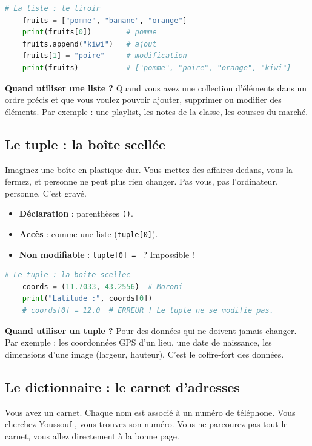 \documentclass[12pt,a4paper]{article}
\begin{document}
\begin{lstlisting}[language=Python]
	# La liste : le tiroir
	fruits = ["pomme", "banane", "orange"]
	print(fruits[0])        # pomme
	fruits.append("kiwi")   # ajout
	fruits[1] = "poire"     # modification
	print(fruits)           # ["pomme", "poire", "orange", "kiwi"]
\end{lstlisting}

\textbf{Quand utiliser une liste ?} Quand vous avez une collection d'éléments dans un ordre précis et que vous voulez pouvoir ajouter, supprimer ou modifier des éléments. Par exemple : une playlist, les notes de la classe, les courses du marché.

\subsection{Le tuple : la boîte scellée}

Imaginez une boîte en plastique dur. Vous mettez des affaires dedans, vous la fermez, et personne ne peut plus rien changer. Pas vous, pas l'ordinateur, personne. C'est gravé.

\begin{itemize}
	\item [\ding{182}] \textbf{Déclaration} : parenthèses \texttt{()}.
	\item [\ding{183}] \textbf{Accès} : comme une liste (\texttt{tuple[0]}).
	\item [\ding{184}] \textbf{Non modifiable} : \texttt{tuple[0] = } ? Impossible !
\end{itemize}

\begin{lstlisting}[language=Python]
	# Le tuple : la boite scellee
	coords = (11.7033, 43.2556)  # Moroni
	print("Latitude :", coords[0])
	# coords[0] = 12.0  # ERREUR ! Le tuple ne se modifie pas.
\end{lstlisting}

\textbf{Quand utiliser un tuple ?} Pour des données qui ne doivent jamais changer. Par exemple : les coordonnées GPS d'un lieu, une date de naissance, les dimensions d'une image (largeur, hauteur). C'est le coffre-fort des données.

\subsection{Le dictionnaire : le carnet d'adresses}

Vous avez un carnet. Chaque nom est associé à un numéro de téléphone. Vous cherchez \og Youssouf \fg, vous trouvez son numéro. Vous ne parcourez pas tout le carnet, vous allez directement à la bonne page.
\end{document}
